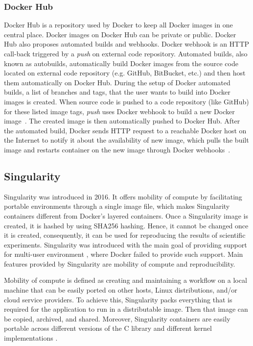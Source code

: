 \subsubsection{Docker Hub}
Docker Hub is a repository used by Docker to keep all Docker
images in one central place. Docker images on Docker Hub can be
private or public. Docker Hub also proposes automated builds and
webhooks. Docker webhook is an HTTP call-back triggered by a
\textit{push} on external code repository. Automated builds,
also known as autobuilds, automatically build Docker images
from the source code located on external code repository (e.g. GitHub,
BitBucket, etc.) and then host them automatically on Docker Hub.
During the setup of Docker automated builds, a list of branches
and tags, that the user wants to build into Docker images is created.
When source code is pushed to a code repository (like GitHub) for
these listed image tags, \textit{push} uses Docker webhook to build a new
Docker image~\cite{dockerdoc_2019}. The created image is then
automatically pushed to Docker Hub. After the automated build,
Docker sends HTTP request to a reachable Docker host on the
Internet to notify it about the availability of new image,
which pulls the built image and restarts container on the
new image through Docker webhooks~\cite{martin2018docker,dockerdoc2__2019}.

\subsection{Singularity}

Singularity was introduced in 2016. It offers mobility of compute by
facilitating portable environments through a single image file, which
makes Singularity containers different from Docker's layered containers.
Once a Singularity image is created, it is hashed by using SHA256 hashing.
Hence, it cannot be changed once it is created, consequently, it can be
used for reproducing the results of scientific experiments. Singularity
was introduced with the main goal of providing support for multi-user
environment \cite{Singularity}, where Docker failed to provide such
support. Main features provided by Singularity are mobility of compute
and reproducibility.

Mobility of compute is defined as creating and maintaining a workflow
on a local machine that can be easily ported on other hosts, Linux
distributions, and/or cloud service providers. To achieve this,
Singularity packs everything that is required for the application
to run in a distributable image. Then that image can be copied,
archived, and shared. Moreover, Singularity containers are easily
portable across different versions of the C library and different
kernel implementations \cite{kurtzer2017singularity}.

